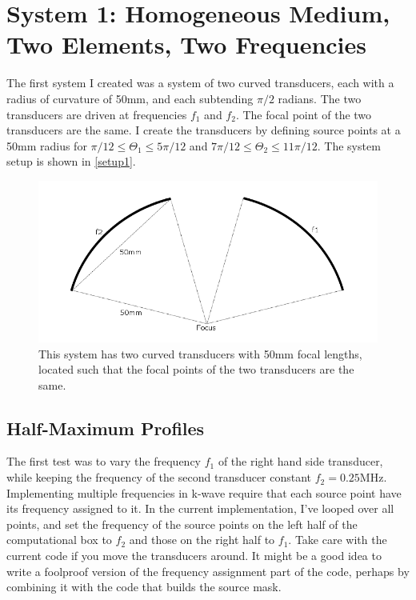 \documentclass[10pt,a4paper]{article}
\begin{document}
\section*{System 1: Homogeneous Medium, Two Elements, Two Frequencies}

The first system I created was a system of two curved transducers, each with a radius of curvature of 50mm, and each subtending $\pi/2$ radians. The two transducers are driven at frequencies $f_1$ and $f_2$. The focal point of the two transducers are the same. I create the transducers by defining source points at a 50mm radius for $\pi/12 \leq \Theta_1 \leq 5\pi/12$ and $7\pi/12 \leq \Theta_2 \leq 11 \pi/12$. The system setup is shown in \autoref{setup1}.

\begin{figure}[!h]
\centering
\includegraphics[scale=0.5]{setup1.png}
\caption{This system has two curved transducers with 50mm focal lengths, located such that the focal points of the two transducers are the same.} \label{setup1}
\centering
\end{figure}

\subsection*{Half-Maximum Profiles}

The first test was to vary the frequency $f_1$ of the right hand side transducer, while keeping the frequency of the second transducer constant $f_2 = 0.25$MHz. Implementing multiple frequencies in k-wave require that each source point have its frequency assigned to it. In the current implementation, I've looped over all points, and set the frequency of the source points on the left half of the computational box to $f_2$ and those on the right half to $f_1$. Take care with the current code if you move the transducers around. It might be a good idea to write a foolproof version of the frequency assignment part of the code, perhaps by combining it with the code that builds the source mask.\\
\end{document}

